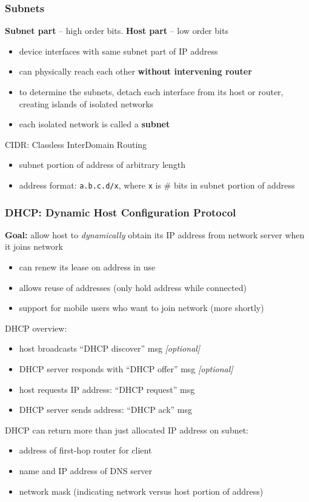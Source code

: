 \subsubsection{Subnets}
\textbf{Subnet part} -- high order bits. \textbf{Host part} -- low order bits
\begin{itemize}
	\item device interfaces with same subnet part of IP address
	\item can physically reach each other \textbf{without intervening router}
	\item to determine the subnets, detach each interface from its host or router, creating islands of isolated networks
	\item each isolated network is called a \textbf{subnet}
\end{itemize}
CIDR: Classless InterDomain Routing
\begin{itemize}
	\item subnet portion of address of arbitrary length
	\item address format: \texttt{a.b.c.d/x}, where \texttt{x} is \# bits in subnet portion of address
\end{itemize}
\subsubsection{DHCP: Dynamic Host Configuration Protocol}
\begin{leftbar}
	\textbf{Goal:} allow host to \textit{dynamically} obtain its IP address from network server when it joins network
\end{leftbar}
\begin{itemize}
	\item can renew its lease on address in use
	\item allows reuse of addresses (only hold address while connected)
	\item support for mobile users who want to join network (more shortly)
\end{itemize}
DHCP overview:
\begin{itemize}
	\item host broadcasts ``DHCP discover'' msg \textit{[optional]}
	\item DHCP server responds with ``DHCP offer'' msg \textit{[optional]}
	\item host requests IP address: ``DHCP request'' msg
	\item DHCP server sends address: ``DHCP ack'' msg
\end{itemize}
DHCP can return more than just allocated IP address on subnet:
\begin{itemize}
	\item address of first-hop router for client
	\item name and IP address of DNS server
	\item network mask (indicating network versus host portion of address)
\end{itemize}
